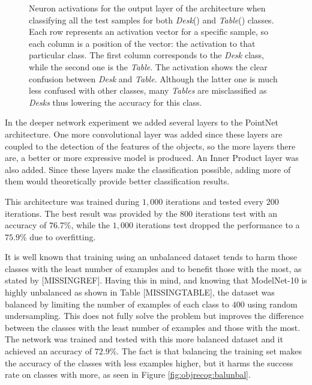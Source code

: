\begin{figure}
    \caption{Neuron activations for the output layer of the architecture when classifying all the test samples for both \emph{Desk}() and \emph{Table}() classes. Each row represents an activation vector for a specific sample, so each column is a position of the vector: the activation to that particular class. The first column corresponds to the \emph{Desk} class, while the second one is the \emph{Table}. The activation shows the clear confusion between \emph{Desk} and \emph{Table}. Although the latter one is much less confused with other classes, many \emph{Tables} are misclassified as \emph{Desks} thus lowering the accuracy for this class.}
    \label{fig:objrecog:tabledesk_activations}
\end{figure}


In the deeper network experiment we added several layers to the PointNet architecture. One more convolutional layer was added since these layers are coupled to the detection of the features of the objects, so the more layers there are, a better or more expressive model is produced. An Inner Product layer was also added. Since these layers make the classification possible, adding more of them would theoretically provide better classification results.

This architecture was trained during $1,000$ iterations and tested every $200$ iterations. The best result was provided by the $800$ iterations test with an accuracy of $76.7$\%, while the $1,000$ iterations test dropped the performance to a $75.9$\% due to overfitting.

It is well known that training using an unbalanced dataset tends to harm those classes with the least number of examples and to benefit those with the most, as stated by [MISSINGREF]. Having this in mind, and knowing that ModelNet-10 is highly unbalanced as shown in Table [MISSINGTABLE], the dataset was balanced by limiting the number of examples of each class to $400$ using random undersampling. This does not fully solve the problem but improves the difference between the classes with the least number of examples and those with the most. The network was trained and tested with this more balanced dataset and it achieved an accuracy of $72.9$\%. The fact is that balancing the training set makes the accuracy of the classes with less examples higher, but it harms the success rate on classes with more, as seen in Figure \ref{fig:objrecog:balunbal}.

